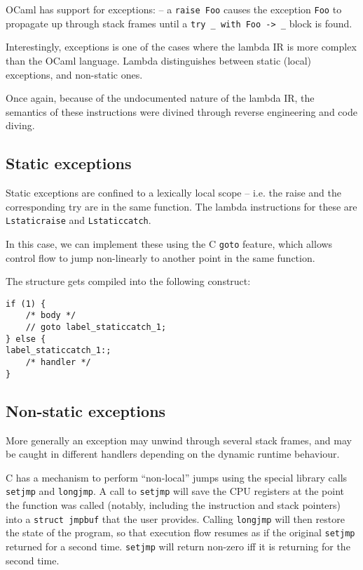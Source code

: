\documentclass[12pt,a4paper,twoside,openright]{report}
\begin{document}
OCaml has support for exceptions: -- a \lstinline!raise Foo! causes the exception \lstinline!Foo! to propagate up through stack frames until a \lstinline!try _ with Foo -> _! block is found.

Interestingly, exceptions is one of the cases where the lambda IR is more complex than the OCaml language. Lambda distinguishes between static (local) exceptions, and non-static ones.

Once again, because of the undocumented nature of the lambda IR, the semantics of these instructions were divined through reverse engineering and code diving.

\subsection{Static exceptions}

Static exceptions are confined to a lexically local scope -- i.e. the raise and the corresponding try are in the same function. The lambda instructions for these are \lstinline!Lstaticraise! and \lstinline!Lstaticcatch!.

In this case, we can implement these using the C \lstinline!goto! feature, which allows control flow to jump non-linearly to another point in the same function.

The structure gets compiled into the following construct:

\begin{lstlisting}
if (1) {
    /* body */
    // goto label_staticcatch_1;
} else {
label_staticcatch_1:;
    /* handler */
}
\end{lstlisting}

\subsection{Non-static exceptions}

More generally an exception may unwind through several stack frames, and may be caught in different handlers depending on the dynamic runtime behaviour.

C has a mechanism to perform ``non-local'' jumps using the special library calls \lstinline!setjmp! and \lstinline!longjmp!. A call to \lstinline!setjmp! will save the CPU registers at the point the function was called (notably, including the instruction and stack pointers) into a \lstinline!struct jmpbuf! that the user provides. Calling \lstinline!longjmp! will then restore the state of the program, so that execution flow resumes as if the original \lstinline!setjmp! returned for a second time. \lstinline!setjmp! will return non-zero iff it is returning for the second time.
\end{document}
